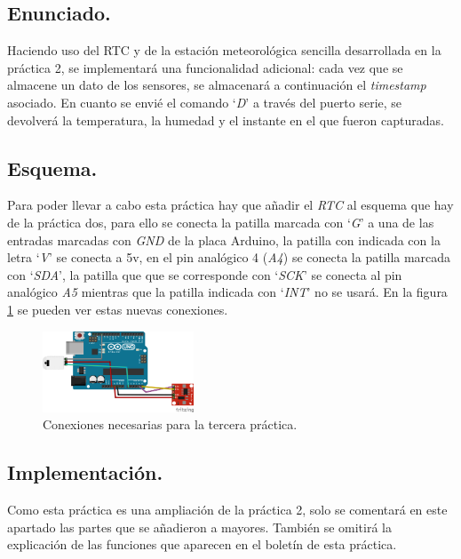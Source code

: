\documentclass{article}
\begin{document}
\subsection{Enunciado.}

	Haciendo uso del RTC y de la estación meteorológica sencilla desarrollada en la práctica 2, se implementará una funcionalidad adicional: cada vez que se almacene un dato de los sensores, se almacenará a continuación el \textit{timestamp} asociado. En cuanto se envié el comando `\textit{D}' a través del puerto serie, se devolverá la temperatura, la humedad y el instante en el que fueron capturadas.
	
\subsection{Esquema.}

	Para poder llevar a cabo esta práctica hay que añadir el \emph{RTC} al esquema que hay de la práctica dos, para ello se conecta la patilla marcada con `\textit{G}' a una de las entradas marcadas con \textit{GND} de la placa Arduino, la patilla con indicada con la letra `\textit{V}' se conecta a 5v, en el pin analógico 4 (\textit{A4}) se conecta la patilla marcada con `\textit{SDA}', la patilla que que se corresponde con `\textit{SCK}' se conecta al pin analógico \textit{A5} mientras que la patilla indicada con `\textit{INT}' no se usará. En la figura \ref{fig:p3:schema} se pueden ver estas nuevas conexiones.

\begin{figure}[h]
  \centering
    \includegraphics[width=0.4\textwidth]{img/p3_schema.png}
  \caption{Conexiones necesarias para la tercera práctica.}
  \label{fig:p3:schema}
\end{figure}

\subsection{Implementación.}
	
	Como esta práctica es una ampliación de la práctica 2, solo se comentará en este apartado las partes que se añadieron a mayores. También se omitirá la explicación de las funciones que aparecen en el boletín de esta práctica. 
	
\end{document}
